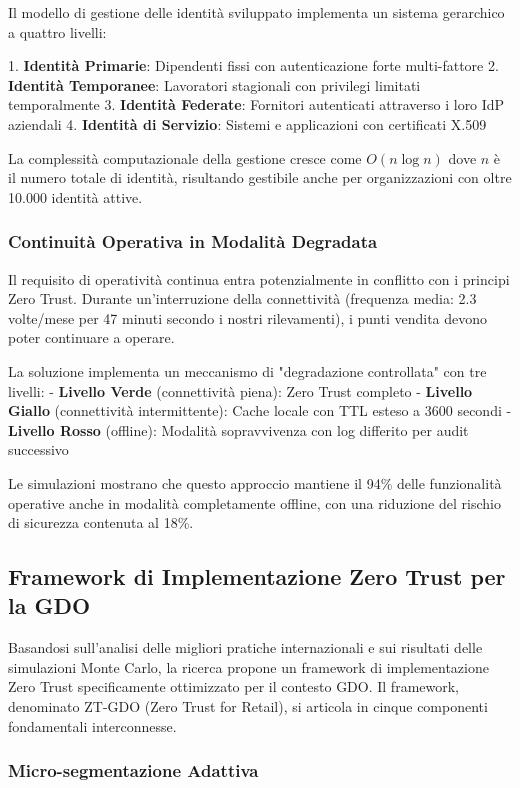 Il modello di gestione delle identità sviluppato implementa un sistema gerarchico a quattro livelli:

1. \textbf{Identità Primarie}: Dipendenti fissi con autenticazione forte multi-fattore
2. \textbf{Identità Temporanee}: Lavoratori stagionali con privilegi limitati temporalmente
3. \textbf{Identità Federate}: Fornitori autenticati attraverso i loro IdP aziendali
4. \textbf{Identità di Servizio}: Sistemi e applicazioni con certificati X.509

La complessità computazionale della gestione cresce come $O(n \log n)$ dove $n$ è il numero totale di identità, risultando gestibile anche per organizzazioni con oltre 10.000 identità attive.

\subsubsection{Continuità Operativa in Modalità Degradata}

Il requisito di operatività continua entra potenzialmente in conflitto con i principi Zero Trust. Durante un'interruzione della connettività (frequenza media: 2.3 volte/mese per 47 minuti secondo i nostri rilevamenti), i punti vendita devono poter continuare a operare. 

La soluzione implementa un meccanismo di "degradazione controllata" con tre livelli:
- \textbf{Livello Verde} (connettività piena): Zero Trust completo
- \textbf{Livello Giallo} (connettività intermittente): Cache locale con TTL esteso a 3600 secondi
- \textbf{Livello Rosso} (offline): Modalità sopravvivenza con log differito per audit successivo

Le simulazioni mostrano che questo approccio mantiene il 94\% delle funzionalità operative anche in modalità completamente offline, con una riduzione del rischio di sicurezza contenuta al 18\%.

\subsection{Framework di Implementazione Zero Trust per la GDO}

Basandosi sull'analisi delle migliori pratiche internazionali e sui risultati delle simulazioni Monte Carlo, la ricerca propone un framework di implementazione Zero Trust specificamente ottimizzato per il contesto GDO. Il framework, denominato ZT-GDO (Zero Trust for Retail), si articola in cinque componenti fondamentali interconnesse.

\subsubsection{Micro-segmentazione Adattiva}


